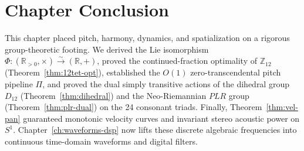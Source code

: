 \section{Chapter Conclusion}

This chapter placed pitch, harmony, dynamics, and spatialization on a rigorous group-theoretic footing. We derived the Lie isomorphism $\Phi : (\mathbb{R}_{>0}, \times) \xrightarrow{\sim} (\mathbb{R}, +)$, proved the continued-fraction optimality of $\mathbb{Z}_{12}$ (Theorem~\ref{thm:12tet-opt}), established the $O(1)$ zero-transcendental pitch pipeline $\Pi$, and proved the dual simply transitive actions of the dihedral group $D_{12}$ (Theorem~\ref{thm:dihedral}) and the Neo-Riemannian $PLR$ group (Theorem~\ref{thm:plr-dual}) on the 24 consonant triads. Finally, Theorem~\ref{thm:vel-pan} guaranteed monotonic velocity curves and invariant stereo acoustic power on $S^1$. Chapter~\ref{ch:waveforms-dsp} now lifts these discrete algebraic frequencies into continuous time-domain waveforms and digital filters.
